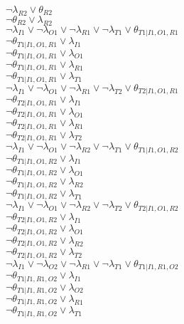 $\neg\lambda_{R2} \vee \theta_{R2}$\\
$\neg\theta_{R2} \vee \lambda_{R2}$\\
$\neg\lambda_{I1} \vee \neg\lambda_{O1} \vee \neg\lambda_{R1} \vee \neg\lambda_{T1} \vee \theta_{T1|I1,O1,R1}$\\
$\neg\theta_{T1|I1,O1,R1} \vee \lambda_{I1}$\\
$\neg\theta_{T1|I1,O1,R1} \vee \lambda_{O1}$\\
$\neg\theta_{T1|I1,O1,R1} \vee \lambda_{R1}$\\
$\neg\theta_{T1|I1,O1,R1} \vee \lambda_{T1}$\\
$\neg\lambda_{I1} \vee \neg\lambda_{O1} \vee \neg\lambda_{R1} \vee \neg\lambda_{T2} \vee \theta_{T2|I1,O1,R1}$\\
$\neg\theta_{T2|I1,O1,R1} \vee \lambda_{I1}$\\
$\neg\theta_{T2|I1,O1,R1} \vee \lambda_{O1}$\\
$\neg\theta_{T2|I1,O1,R1} \vee \lambda_{R1}$\\
$\neg\theta_{T2|I1,O1,R1} \vee \lambda_{T2}$\\
$\neg\lambda_{I1} \vee \neg\lambda_{O1} \vee \neg\lambda_{R2} \vee \neg\lambda_{T1} \vee \theta_{T1|I1,O1,R2}$\\
$\neg\theta_{T1|I1,O1,R2} \vee \lambda_{I1}$\\
$\neg\theta_{T1|I1,O1,R2} \vee \lambda_{O1}$\\
$\neg\theta_{T1|I1,O1,R2} \vee \lambda_{R2}$\\
$\neg\theta_{T1|I1,O1,R2} \vee \lambda_{T1}$\\
$\neg\lambda_{I1} \vee \neg\lambda_{O1} \vee \neg\lambda_{R2} \vee \neg\lambda_{T2} \vee \theta_{T2|I1,O1,R2}$\\
$\neg\theta_{T2|I1,O1,R2} \vee \lambda_{I1}$\\
$\neg\theta_{T2|I1,O1,R2} \vee \lambda_{O1}$\\
$\neg\theta_{T2|I1,O1,R2} \vee \lambda_{R2}$\\
$\neg\theta_{T2|I1,O1,R2} \vee \lambda_{T2}$\\
$\neg\lambda_{I1} \vee \neg\lambda_{O2} \vee \neg\lambda_{R1} \vee \neg\lambda_{T1} \vee \theta_{T1|I1,R1,O2}$\\
$\neg\theta_{T1|I1,R1,O2} \vee \lambda_{I1}$\\
$\neg\theta_{T1|I1,R1,O2} \vee \lambda_{O2}$\\
$\neg\theta_{T1|I1,R1,O2} \vee \lambda_{R1}$\\
$\neg\theta_{T1|I1,R1,O2} \vee \lambda_{T1}$\\
